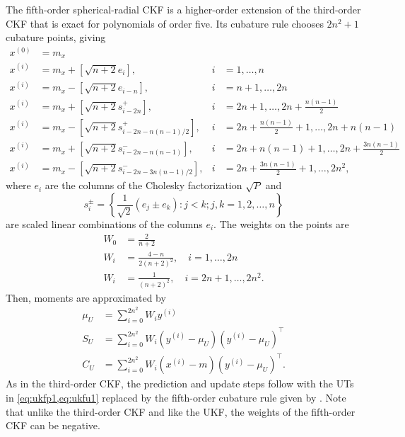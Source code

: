 \documentclass[../zhang_thesis.tex]{subfiles}
\begin{document}
The fifth-order spherical-radial CKF is a higher-order extension of the third-order CKF that is exact for polynomials of order five. Its cubature rule chooses $2n^2+1$ cubature points, giving~\cite{jia13,stroud71}
\begin{align}
    x^{(0)} & = m_x \\
    x^{(i)} & = m_x + \left[ \sqrt{n+2} e_i \right], & i&=1,\dots,n \label{eq:cr5_1} \\
    x^{(i)} & = m_x - \left[ \sqrt{n+2} e_{i-n} \right], & i&=n+1,\dots,2n \\
    x^{(i)} & = m_x + \left[ \sqrt{n+2} s^+_{i-2n} \right], & i&=2n+1,\dots,2n+\frac{n(n-1)}{2} \\
    x^{(i)} & = m_x - \left[ \sqrt{n+2} s^+_{i-2n-n(n-1)/2} \right], & i&=2n+\frac{n(n-1)}{2}+1,\dots,2n+n(n-1) \\
    x^{(i)} & = m_x + \left[ \sqrt{n+2} s^-_{i-2n-n(n-1)} \right], & i&=2n+n(n-1)+1,\dots,2n+\frac{3n(n-1)}{2} \\
    x^{(i)} & = m_x - \left[ \sqrt{n+2} s^-_{i-2n-3n(n-1)/2} \right], & i&=2n+\frac{3n(n-1)}{2}+1,\dots,2n^2,
\end{align}
where $e_i$ are the columns of the Cholesky factorization $\sqrt{P}$ and
\begin{equation}
    {s^{\pm}_i} = \left\{ \frac{1}{\sqrt{2}} (e_j \pm e_k) : j<k; j,k=1,2,\dots,n \right\}
\end{equation}
are scaled linear combinations of the columns $e_i$. The weights on the points are
\begin{align}
    W_0 & = \frac{2}{n+2} \\
    W_i & = \frac{4-n}{2(n+2)^2}, \quad i=1,\dots,2n \\
    W_i & = \frac{1}{(n+2)^2}, \quad i=2n+1,\dots,2n^2.
\end{align}
Then, moments are approximated by
\begin{align}
    \mu_U & = \sum_{i=0}^{2n^2} W_i y^{(i)} \\
    S_U & = \sum_{i=0}^{2n^2} W_i ( y^{(i)} - \mu_U ) ( y^{(i)} - \mu_U )^\top \\
    C_U & = \sum_{i=0}^{2n^2} W_i ( x^{(i)} - m ) ( y^{(i)} - \mu_U )^\top. \label{eq:cr5_l}
\end{align}
As in the third-order CKF, the prediction and update steps follow  with the UTs in \cref{eq:ukfp1,eq:ukfu1} replaced by the fifth-order cubature rule given by . Note that unlike the third-order CKF and like the UKF, the weights of the fifth-order CKF can be negative.
\end{document}
